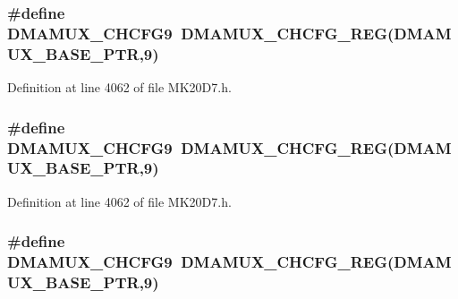 \subsubsection[{\texorpdfstring{D\+M\+A\+M\+U\+X\+\_\+\+C\+H\+C\+F\+G9}{DMAMUX_CHCFG9}}]{\setlength{\rightskip}{0pt plus 5cm}\#define D\+M\+A\+M\+U\+X\+\_\+\+C\+H\+C\+F\+G9~{\bf D\+M\+A\+M\+U\+X\+\_\+\+C\+H\+C\+F\+G\+\_\+\+R\+EG}({\bf D\+M\+A\+M\+U\+X\+\_\+\+B\+A\+S\+E\+\_\+\+P\+TR},9)}\hypertarget{group___d_m_a_m_u_x___register___accessor___macros_ga9f40b539d1a70d5c0608bf8032032ba9}{}\label{group___d_m_a_m_u_x___register___accessor___macros_ga9f40b539d1a70d5c0608bf8032032ba9}


Definition at line 4062 of file M\+K20\+D7.\+h.

\subsubsection[{\texorpdfstring{D\+M\+A\+M\+U\+X\+\_\+\+C\+H\+C\+F\+G9}{DMAMUX_CHCFG9}}]{\setlength{\rightskip}{0pt plus 5cm}\#define D\+M\+A\+M\+U\+X\+\_\+\+C\+H\+C\+F\+G9~{\bf D\+M\+A\+M\+U\+X\+\_\+\+C\+H\+C\+F\+G\+\_\+\+R\+EG}({\bf D\+M\+A\+M\+U\+X\+\_\+\+B\+A\+S\+E\+\_\+\+P\+TR},9)}\hypertarget{group___d_m_a_m_u_x___register___accessor___macros_ga9f40b539d1a70d5c0608bf8032032ba9}{}\label{group___d_m_a_m_u_x___register___accessor___macros_ga9f40b539d1a70d5c0608bf8032032ba9}


Definition at line 4062 of file M\+K20\+D7.\+h.

\subsubsection[{\texorpdfstring{D\+M\+A\+M\+U\+X\+\_\+\+C\+H\+C\+F\+G9}{DMAMUX_CHCFG9}}]{\setlength{\rightskip}{0pt plus 5cm}\#define D\+M\+A\+M\+U\+X\+\_\+\+C\+H\+C\+F\+G9~{\bf D\+M\+A\+M\+U\+X\+\_\+\+C\+H\+C\+F\+G\+\_\+\+R\+EG}({\bf D\+M\+A\+M\+U\+X\+\_\+\+B\+A\+S\+E\+\_\+\+P\+TR},9)}\hypertarget{group___d_m_a_m_u_x___register___accessor___macros_ga9f40b539d1a70d5c0608bf8032032ba9}{}\label{group___d_m_a_m_u_x___register___accessor___macros_ga9f40b539d1a70d5c0608bf8032032ba9}


